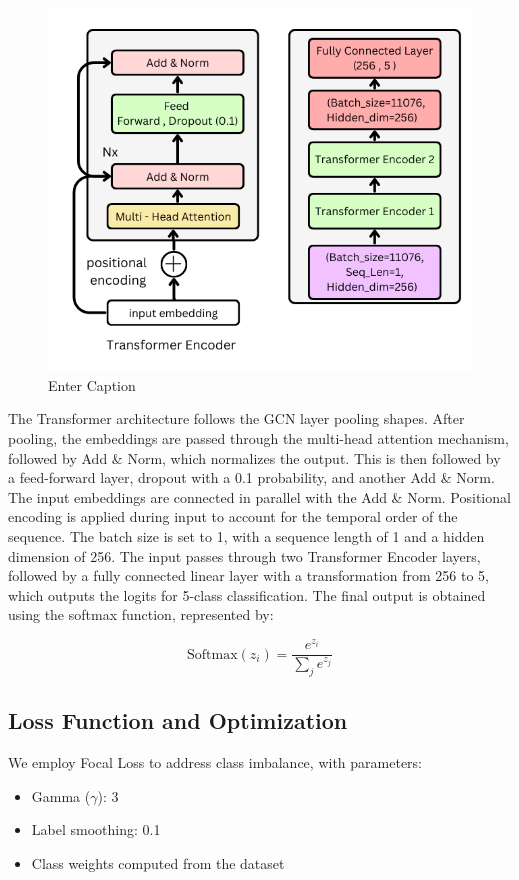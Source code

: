 \begin{figure}[!h]
    \centering
    \includegraphics[width=0.7\linewidth]{img/transformer.png}
    \caption{Enter Caption}
    \label{fig:enter-label}
\end{figure}

The Transformer architecture follows the GCN layer pooling shapes. After pooling, the embeddings are passed through the multi-head attention mechanism, followed by Add \& Norm, which normalizes the output. This is then followed by a feed-forward layer, dropout with a 0.1 probability, and another Add \& Norm. The input embeddings are connected in parallel with the Add \& Norm. Positional encoding is applied during input to account for the temporal order of the sequence. The batch size is set to 1, with a sequence length of 1 and a hidden dimension of 256. The input passes through two Transformer Encoder layers, followed by a fully connected linear layer with a transformation from 256 to 5, which outputs the logits for 5-class classification. The final output is obtained using the softmax function, represented by:

\[
\text{Softmax}(z_i) = \frac{e^{z_i}}{\sum_j e^{z_j}}
\]



 
\subsection{Loss Function and Optimization}
We employ Focal Loss to address class imbalance, with parameters:
\begin{itemize}
    \item Gamma ($\gamma$): 3
    \item Label smoothing: 0.1
    \item Class weights computed from the dataset
\end{itemize}

